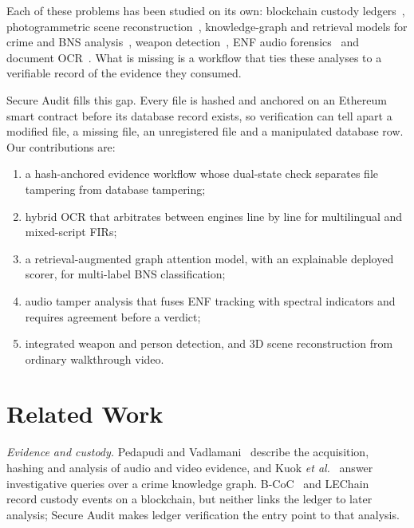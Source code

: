 \documentclass[conference]{IEEEtran}
\begin{document}
Each of these problems has been studied on its own: blockchain custody ledgers~\cite{bonomi2018bcoc,li2021lechain}, photogrammetric scene reconstruction~\cite{sazaly3d,balbudhe2024}, knowledge-graph and retrieval models for crime and BNS analysis~\cite{kuok2024,mathias2024,dhanushkumar2024}, weapon detection~\cite{quyyum2024,werukanjana2024}, ENF audio forensics~\cite{ngharamike2023,pedapudi2024} and document OCR~\cite{alsayem2024}. What is missing is a workflow that ties these analyses to a verifiable record of the evidence they consumed.

Secure Audit fills this gap. Every file is hashed and anchored on an Ethereum smart contract before its database record exists, so verification can tell apart a modified file, a missing file, an unregistered file and a manipulated database row. Our contributions are:
\begin{enumerate}
    \item a hash-anchored evidence workflow whose dual-state check separates file tampering from database tampering;
    \item hybrid OCR that arbitrates between engines line by line for multilingual and mixed-script FIRs;
    \item a retrieval-augmented graph attention model, with an explainable deployed scorer, for multi-label BNS classification;
    \item audio tamper analysis that fuses ENF tracking with spectral indicators and requires agreement before a verdict;
    \item integrated weapon and person detection, and 3D scene reconstruction from ordinary walkthrough video.
\end{enumerate}

\section{Related Work}
\label{sec:related}

\textit{Evidence and custody.} Pedapudi and Vadlamani~\cite{pedapudi2024} describe the acquisition, hashing and analysis of audio and video evidence, and Kuok \textit{et al.}~\cite{kuok2024} answer investigative queries over a crime knowledge graph. B-CoC~\cite{bonomi2018bcoc} and LEChain~\cite{li2021lechain} record custody events on a blockchain, but neither links the ledger to later analysis; Secure Audit makes ledger verification the entry point to that analysis.
\end{document}
